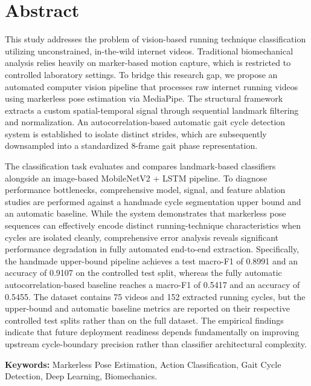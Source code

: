 \chapter*{Abstract}

This study addresses the problem of vision-based running technique classification utilizing unconstrained, in-the-wild internet videos. Traditional biomechanical analysis relies heavily on marker-based motion capture, which is restricted to controlled laboratory settings. To bridge this research gap, we propose an automated computer vision pipeline that processes raw internet running videos using markerless pose estimation via MediaPipe. The structural framework extracts a custom spatial-temporal signal  through sequential landmark filtering and normalization. An autocorrelation-based automatic gait cycle detection system is established to isolate distinct strides, which are subsequently downsampled into a standardized 8-frame gait phase representation. 

The classification task evaluates and compares landmark-based classifiers alongside an image-based MobileNetV2 + LSTM pipeline. To diagnose performance bottlenecks, comprehensive model, signal, and feature ablation studies are performed against a handmade cycle segmentation upper bound and an automatic baseline. While the system demonstrates that markerless pose sequences can effectively encode distinct running-technique characteristics when cycles are isolated cleanly, comprehensive error analysis reveals significant performance degradation in fully automated end-to-end extraction. Specifically, the handmade upper-bound pipeline achieves a test macro-F1 of 0.8991 and an accuracy of 0.9107 on the controlled test split, whereas the fully automatic autocorrelation-based baseline reaches a macro-F1 of 0.5417 and an accuracy of 0.5455. The dataset contains 75 videos and 152 extracted running cycles, but the upper-bound and automatic baseline metrics are reported on their respective controlled test splits rather than on the full dataset. The empirical findings indicate that future deployment readiness depends fundamentally on improving upstream cycle-boundary precision rather than classifier architectural complexity.

\vspace{1.0cm}
\noindent \textbf{Keywords:} Markerless Pose Estimation, Action Classification, Gait Cycle Detection, Deep Learning, Biomechanics.
